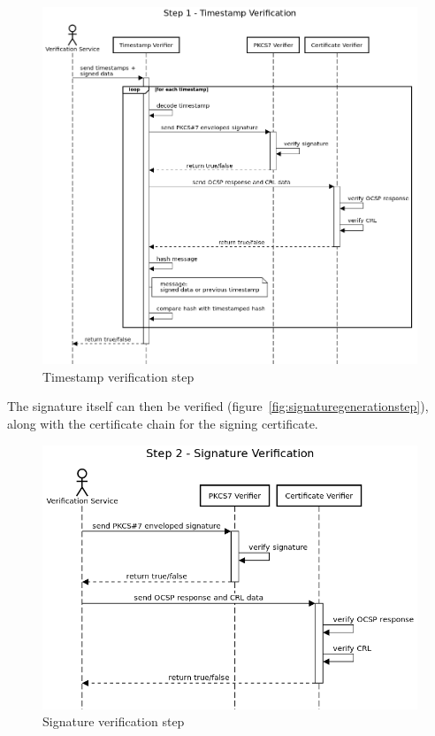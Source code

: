 \begin{figure}[H]
    \begin{center}
        \includegraphics[scale=0.5]{images/protocol_verification_step1_timestamp.png}
        \caption{Timestamp verification step}
        \label{fig:timestampverificationstep}
    \end{center}
\end{figure}
\pagebreak

The signature itself can then be verified (figure~\ref{fig:signaturegenerationstep}), along with
the certificate chain for the signing certificate.

\begin{figure}[H]
    \begin{center}
        \includegraphics[scale=0.48]{images/protocol_verification_step2_signature.png}
        \caption{Signature verification step}
        \label{fig:signatureverificationstep}
    \end{center}
\end{figure}

